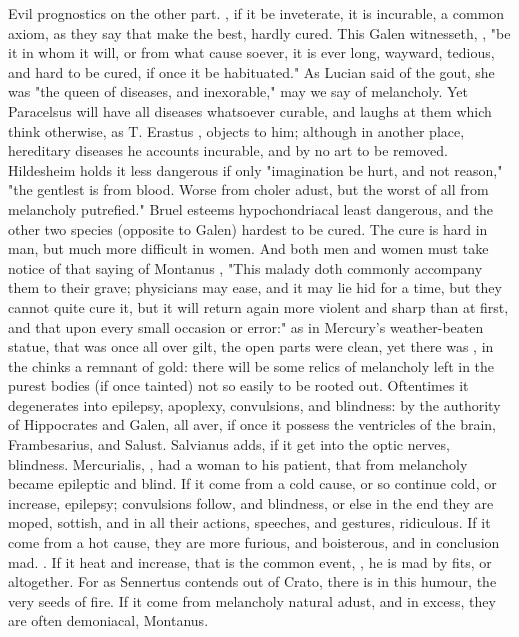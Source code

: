 Evil prognostics on the other part. , if
it be inveterate, it is incurable, a common axiom,  as they say that make the best, hardly cured. This Galen
witnesseth, ,
"be it in whom it will, or from what cause soever, it is
ever long, wayward, tedious, and hard to be cured, if once it be habituated."
As Lucian said of the gout, she was "the queen of
diseases, and inexorable," may we say of melancholy. Yet Paracelsus will have
all diseases whatsoever curable, and laughs at them which think otherwise, as
T. Erastus , objects to him; although in another
place, hereditary diseases he accounts incurable, and by no art to be removed.
Hildesheim  holds
it less dangerous if only "imagination be hurt, and not
reason," "the gentlest is from blood. Worse from choler
adust, but the worst of all from melancholy putrefied."
Bruel esteems hypochondriacal least dangerous, and the
other two species (opposite to Galen) hardest to be cured.
The cure is hard in man, but much more difficult in women.
And both men and women must take notice of that saying of Montanus
, "This
malady doth commonly accompany them to their grave; physicians may ease, and it
may lie hid for a time, but they cannot quite cure it, but it will return again
more violent and sharp than at first, and that upon every small occasion or
error:" as in Mercury's weather-beaten statue, that was once all over gilt, the
open parts were clean, yet there was , in the chinks a
remnant of gold: there will be some relics of melancholy left in the purest
bodies (if once tainted) not so easily to be rooted out.
Oftentimes it degenerates into epilepsy, apoplexy,
convulsions, and blindness: by the authority of Hippocrates and Galen,
all aver, if once it possess the ventricles of the brain,
Frambesarius, and Salust. Salvianus adds, if it get into the optic nerves,
blindness. Mercurialis, , had a woman to his
patient, that from melancholy became epileptic and blind.
If it come from a cold cause, or so continue cold, or
increase, epilepsy; convulsions follow, and blindness, or else in the end they
are moped, sottish, and in all their actions, speeches, and gestures,
ridiculous. If it come from a hot cause, they are more
furious, and boisterous, and in conclusion mad. . If it heat and increase, that is
the common event, ,
he is mad by fits, or altogether. For as Sennertus
contends out of Crato, there is  in this humour, the very
seeds of fire. If it come from melancholy natural adust, and in excess, they
are often demoniacal, Montanus.

